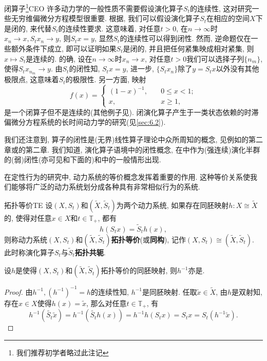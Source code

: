 \begin{remark}{闭算子\footnote{我们推荐初学者略过此注记}}{CEO}
	许多动力学的一般性质不需要假设演化算子$S_{t}$的连续性, 这对研究一些无穷维偏微分方程模型很重要. 根据\cite{Pata07}, 我们可以假设演化算子$S_{t}$在相应的空间$X$下是闭的, 来代替$S_{t}$的连续性要求. 这意味着, 对任意$t>0$, 在$n\to\infty$时$x_{n}\to x, S_{t}x_{n}\to y$, 则$S_{t}x=y$, 显然$S_{t}$的连续性可以得到闭性. 然而, 逆命题仅在一些额外条件下成立, 即可以证明如果$S_{t}$是闭的, 并且把任何紧集映成相对紧集, 则$x\mapsto S_{t}$是连续的. 的确, 设在$n\to\infty$时$x_{n}\to x$, 对任意$t>0$我们可以选择子列$\{n_{m}\}$, 使得$S_{t}x_{n_{m}}\to y$. 由$S_{t}$的闭性知, $S_{t}x=y$, 进一步, $\{S_{t}x_{n}\}$除了$y=S_{t}x$以外没有其他极限点, 这意味着$S_{t}$的极限性. 另一方面, 映射$$f(x)=\begin{cases}(1-x)^{-1},&\quad 0\leqslant x<1;\\x,&\quad x\geqslant 1,\end{cases}$$是一个闭算子但不是连续的(其他例子见\cite{Pata07}). 闭演化算子产生于一类状态依赖的时滞偏微分方程系统的长时间动力学的研究(见\ref{sec:6.2}).
	
	我们还注意到, 算子的闭性是(无界)线性算子理论中众所周知的概念, 见例如\cite{Dunford58}的第二章或\cite{Yosida74}的第二章. 我们知道, 演化算子语境中的闭性概念, 在\cite{Babin92}中作为(强连续)演化半群的(弱)闭性(亦可见\cite{Chueshov99}和下面的)和\cite{Pata07}中的一般情形出现. 
\end{remark}

在定性行为的研究中, 动力系统的等价概念发挥着重要的作用. 这种等价关系使我们能够将广泛的动力系统划分成各种具有非常相似行为的系统. 

\begin{definition}{拓扑等价}{TE}
	设$(X,S_{t})$和$(\tilde{X},\tilde{S}_{t})$为两个动力系统, 如果存在同胚映射$h: X\cong\tilde{X}$的, 使得对任意$x\in X$和$t\in\mathbb{T}_{+}$, 都有$$
	h(S_{t}x)=\tilde{S}_{t}h(x),$$则称动力系统$(X,S_{t})$和$(\tilde{X},\tilde{S}_{t})$\textbf{拓扑等价}(或\textbf{同构}), 记作$(X,S_{t})\cong (\tilde{X},\tilde{S}_{t})$.  此时称演化算子$S_{t}$与$\tilde{S}_{t}$\textbf{拓扑共轭}.  
\end{definition}

\begin{exercise}
	设$h$是使得$(X,S_{t})$和$(\tilde{X},\tilde{S}_{t})$拓扑等价的同胚映射, 则$h^{-1}$亦是.
\end{exercise}

\begin{proof}
	由$h^{-1},(h^{-1})^{-1}=h$的连续性知, $h^{-1}$是同胚映射. 任取$\tilde{x}\in \tilde{X}$, 由$h$是双射知, 存在$x\in X$使得$h(x)=\tilde{x}$, 那么对任意$t\in\mathbb{T}_{+}$, 有$$
	h^{-1}(\tilde{S_{t}}\tilde{x})=h^{-1}(\tilde{S_{t}}h(x))=h^{-1}h(S_{t}x)=S_{t}x=S_{t}(h^{-1}\tilde{x}).$$
\end{proof}

